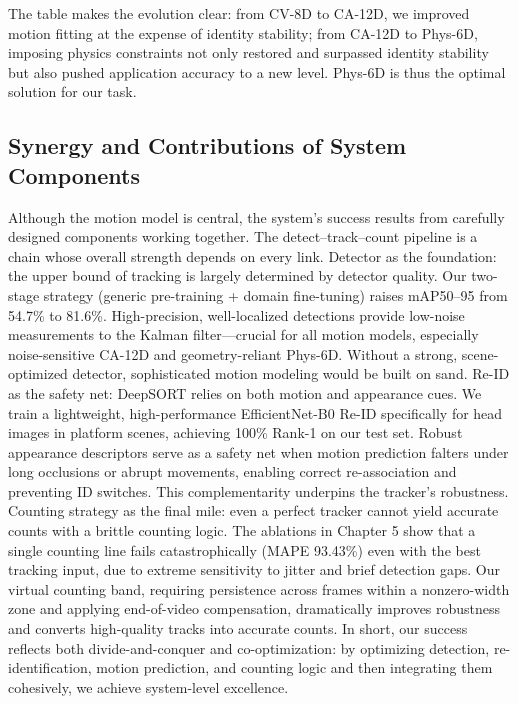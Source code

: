 The table makes the evolution clear: from CV-8D to CA-12D, we improved motion fitting at the expense of identity stability; from CA-12D to Phys-6D, imposing physics constraints not only restored and surpassed identity stability but also pushed application accuracy to a new level. Phys-6D is thus the optimal solution for our task.

\subsection{Synergy and Contributions of System Components}

Although the motion model is central, the system’s success results from carefully designed components working together. The detect–track–count pipeline is a chain whose overall strength depends on every link.
Detector as the foundation: the upper bound of tracking is largely determined by detector quality. Our two-stage strategy (generic pre-training + domain fine-tuning) raises mAP50–95 from 54.7\% to 81.6\%. High-precision, well-localized detections provide low-noise measurements to the Kalman filter—crucial for all motion models, especially noise-sensitive CA-12D and geometry-reliant Phys-6D. Without a strong, scene-optimized detector, sophisticated motion modeling would be built on sand.
Re-ID as the safety net: DeepSORT relies on both motion and appearance cues. We train a lightweight, high-performance EfficientNet-B0 Re-ID specifically for head images in platform scenes, achieving 100\% Rank-1 on our test set. Robust appearance descriptors serve as a safety net when motion prediction falters under long occlusions or abrupt movements, enabling correct re-association and preventing ID switches. This complementarity underpins the tracker’s robustness.
Counting strategy as the final mile: even a perfect tracker cannot yield accurate counts with a brittle counting logic. The ablations in Chapter 5 show that a single counting line fails catastrophically (MAPE 93.43\%) even with the best tracking input, due to extreme sensitivity to jitter and brief detection gaps. Our virtual counting band, requiring persistence across frames within a nonzero-width zone and applying end-of-video compensation, dramatically improves robustness and converts high-quality tracks into accurate counts.
In short, our success reflects both divide-and-conquer and co-optimization: by optimizing detection, re-identification, motion prediction, and counting logic and then integrating them cohesively, we achieve system-level excellence.

